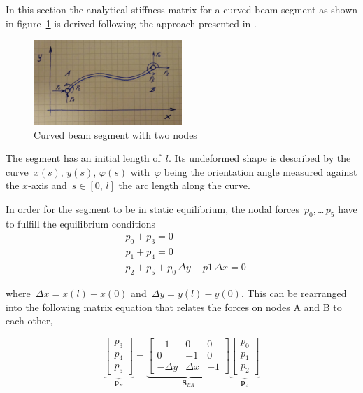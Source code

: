 In this section the analytical stiffness matrix for a curved beam segment as shown in figure~\ref{fig:beam-linear-1} is derived following the approach presented in \cite{bib:curved-beam-stiffness-matrix}.

\begin{figure}[h]
\centering
\includegraphics[width=0.5\textwidth]{figures/elements/beam-linear-1}
\caption{Curved beam segment with two nodes}
\label{fig:beam-linear-1}
\end{figure}

The segment has an initial length of~$l$. Its undeformed shape is described by the curve~$x(s)$, $y(s)$, $\varphi(s)$ with~$\varphi$ being the orientation angle measured against the $x$-axis and~$s \in [0,\,l]$ the arc length along the curve.

In order for the segment to be in static equilibrium, the nodal forces~$p_0$,\,\ldots\,$p_5$ have to fulfill the equilibrium conditions
%
\begin{align}
&p_0 + p_3 = 0 \\
&p_1 + p_4 = 0 \\
&p_2 + p_5 + p_0\,\Delta y - p1\,\Delta x = 0
\end{align}

where~$\Delta x = x(l) - x(0)$ and~$\Delta y = y(l) - y(0)$. This can be rearranged into the following matrix equation that relates the forces on nodes A and B to each other,

\begin{equation}
\underbrace{
\begin{bmatrix}
p_3 \\ p_4 \\ p_5
\end{bmatrix}
}_{\boldsymbol{p}_B}
=
\underbrace{
\begin{bmatrix}
-1 &  0 & 0 \\
 0 & -1 & 0 \\
-\Delta y & \Delta x & -1
\end{bmatrix}
}_{\boldsymbol{S}_{BA}}
\underbrace{
\begin{bmatrix}
p_0 \\ p_1 \\ p_2
\end{bmatrix}
}_{\boldsymbol{p}_A}
\label{eq:linear-beam-static-relation}
\end{equation}


